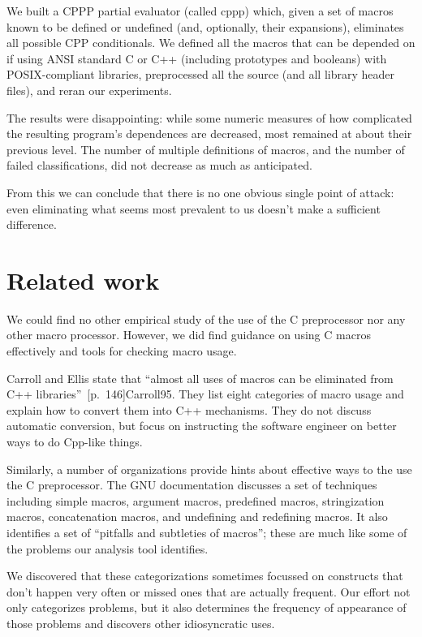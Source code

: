 \documentclass[10pt]{article}
\begin{document}
    We built a CPPP partial evaluator (called cppp) which, given a set of
      macros known to be defined or undefined (and, optionally, their
      expansions), eliminates all possible CPP conditionals.  We defined
      all the macros that can be depended on if using ANSI standard C or
      C++ (including prototypes and booleans) with POSIX-compliant
      libraries, preprocessed all the source (and 
      all library header files), and reran our experiments.

    The results were disappointing:  while some numeric measures of how
      complicated the resulting program's dependences are decreased, most
      remained at about their previous level.  The number of multiple
      definitions of macros, and the number of failed classifications, did
      not decrease as much as anticipated.

    From this we can conclude that there is no one obvious single point of
      attack:  even eliminating what seems most prevalent to us doesn't
      make a sufficient difference.



\section{Related work}
\label{sec:related}


We could find no other empirical study of the use of the C preprocessor nor
any other macro processor.  However, we did find guidance on using C macros
effectively and tools for checking macro usage.

Carroll and Ellis state that ``almost all uses of macros can be eliminated
from C++ libraries''~[p.~146]{Carroll95}.  They list eight categories
of macro usage and explain how to convert them into C++ mechanisms.  They
do not discuss automatic conversion, but focus on instructing the software
engineer on better ways to do Cpp-like things.

Similarly, a number of organizations provide hints about effective ways to
the use the C preprocessor.  The GNU documentation discusses
a set of techniques including simple macros, argument macros, predefined
macros, stringization macros, concatenation macros, and undefining and
redefining macros.  It also identifies a set of ``pitfalls and subtleties
of macros''; these are much like some of the problems our analysis tool
identifies.

We discovered that these categorizations sometimes focussed on constructs
that don't happen very often or missed ones that are actually frequent.
Our effort not only categorizes problems, but it also determines the
frequency of appearance of those problems and discovers other idiosyncratic
uses.
\end{document}
